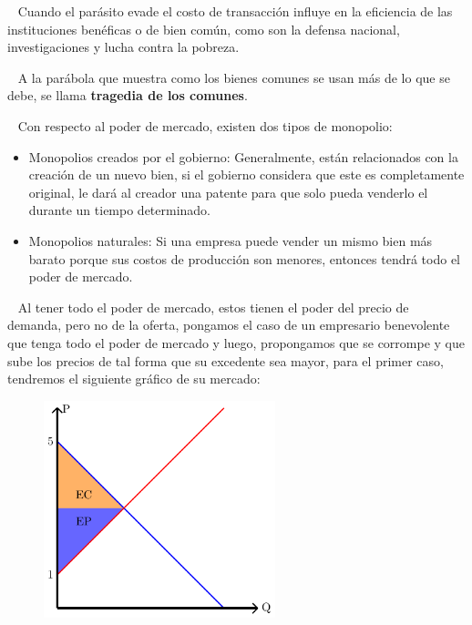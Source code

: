 \documentclass[
  letterpaper,
  DIV=11,
  numbers=noendperiod]{scrreport}
\providecommand{\tightlist}{%
  \setlength{\itemsep}{0pt}\setlength{\parskip}{0pt}}\usepackage{longtable,booktabs,array}
\begin{document}
~ Cuando el parásito evade el costo de transacción influye en la
eficiencia de las instituciones benéficas o de bien común, como son la
defensa nacional, investigaciones y lucha contra la pobreza.

~ A la parábola que muestra como los bienes comunes se usan más de lo
que se debe, se llama \textbf{tragedia de los comunes}.

~ Con respecto al poder de mercado, existen dos tipos de monopolio:

\begin{itemize}
\tightlist
\item
  Monopolios creados por el gobierno: Generalmente, están relacionados
  con la creación de un nuevo bien, si el gobierno considera que este es
  completamente original, le dará al creador una patente para que solo
  pueda venderlo el durante un tiempo determinado.
\item
  Monopolios naturales: Si una empresa puede vender un mismo bien más
  barato porque sus costos de producción son menores, entonces tendrá
  todo el poder de mercado.
\end{itemize}

~ Al tener todo el poder de mercado, estos tienen el poder del precio de
demanda, pero no de la oferta, pongamos el caso de un empresario
benevolente que tenga todo el poder de mercado y luego, propongamos que
se corrompe y que sube los precios de tal forma que su excedente sea
mayor, para el primer caso, tendremos el siguiente gráfico de su
mercado:

\begin{figure}

{\centering \includegraphics[width=0.6\textwidth,height=\textheight]{4sistimpo_files/figure-pdf/unnamed-chunk-1-1.pdf}

}

\end{figure}
\end{document}
